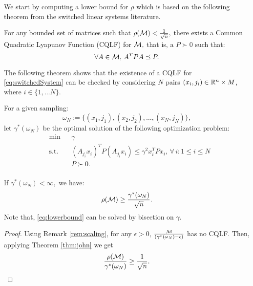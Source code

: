We start by computing a lower bound for $\rho$ which is based on the following theorem from the switched linear systems literature.

\begin{theorem}\cite[Theorem 2.11]{jungers_lncis}\label{thm:john}
For any bounded set of matrices such that $\rho(\mathcal{M})<\frac{1}{\sqrt{n}},$ there exists a Common Quadratic Lyapunov Function (CQLF) for $\mathcal{M},$ that is, a $P\succ 0$ such that: $$\forall A\in \mathcal{M},\, A^TPA\preceq P. $$
\end{theorem}

The following theorem shows that the existence of a CQLF for \eqref{eq:switchedSystem} can be checked by considering $N$ pairs $(x_i, j_i) \in \mathbb{R}^n \times M$, where $i \in \{1, \ldots N\}.$%
%

\begin{theorem}
For a given sampling: $$\omega_N := \{(x_1, j_1), (x_2, j_2), \ldots, (x_N, j_N)\},$$ let $\gamma^*(\omega_N)$ be the optimal solution of the following optimization problem:
\begin{equation}\label{eq:lowerbound}
\begin{aligned}
& \text{min} & & \gamma \\
& \text{s.t.} 
&  & (A_{j_i}x_i)^T P (A_{j_i}x_i) \leq \gamma^2 x_i^TPx_i,\,  \forall \,i :1\leq i \leq N\\
& && P \succ 0. \\
\end{aligned}
\end{equation}

If $\gamma^*(\omega_N)<\infty,$ we have:
$$\rho(\mathcal{M}) \geq \frac{\gamma^*(\omega_N)}{\sqrt{n}}.$$ Note that, \eqref{eq:lowerbound} can be solved by bisection on $\gamma$.

\end{theorem}
\begin{proof}
Using Remark \ref{rem:scaling}, for any $\epsilon > 0$, $\frac{\mathcal{M}}{(\gamma^*(\omega_N)-\epsilon)}$ has no CQLF. Then, applying Theorem \ref{thm:john} we get
\begin{equation*}\frac{\rho(\mathcal{M})}{\gamma^*(\omega_N)} \geq \frac{1}{\sqrt{n}}.\end{equation*}
\end{proof}